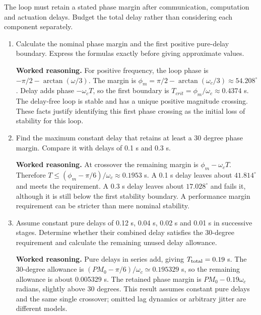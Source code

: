 \documentclass[10pt,a4paper]{article}
\newcommand{\task}[2]{\par\medskip{\color{ink}\Large\bfseries #1. #2}\par\smallskip}
\newcommand{\answer}{\par\smallskip\textbf{Worked reasoning.} }
\begin{document}
\newpage
\task{2}{Allocating a finite phase budget}
The loop must retain a stated phase margin after communication, computation and actuation delays. Budget the total delay rather than considering each component separately.
\begin{enumerate}
\item Calculate the nominal phase margin and the first positive pure-delay boundary. Express the formulas exactly before giving approximate values.
\answer For positive frequency, the loop phase is $-\pi/2-\arctan(\omega/3)$. The margin is $\phi_m=\pi/2-\arctan(\omega_c/3)\approx54.208^\circ$. Delay adds phase $-\omega_cT$, so the first boundary is $T_{crit}=\phi_m/\omega_c\approx0.4374$ s. The delay-free loop is stable and has a unique positive magnitude crossing. These facts justify identifying this first phase crossing as the initial loss of stability for this loop.
\item Find the maximum constant delay that retains at least a 30 degree phase margin. Compare it with delays of 0.1 s and 0.3 s.
\answer At crossover the remaining margin is $\phi_m-\omega_cT$. Therefore $T\le(\phi_m-\pi/6)/\omega_c\approx0.1953$ s. A 0.1 s delay leaves about $41.814^\circ$ and meets the requirement. A 0.3 s delay leaves about $17.028^\circ$ and fails it, although it is still below the first stability boundary. A performance margin requirement can be stricter than mere nominal stability.
\item Assume constant pure delays of 0.12 s, 0.04 s, 0.02 s and 0.01 s in successive stages. Determine whether their combined delay satisfies the 30-degree requirement and calculate the remaining unused delay allowance.
\answer Pure delays in series add, giving $T_{\rm total}=0.19$ s. The 30-degree allowance is $(PM_0-\pi/6)/\omega_c\simeq0.195329$ s, so the remaining allowance is about 0.005329 s. The retained phase margin is $PM_0-0.19\omega_c$ radians, slightly above 30 degrees. This result assumes constant pure delays and the same single crossover; omitted lag dynamics or arbitrary jitter are different models.
\end{enumerate}
\end{document}
